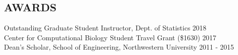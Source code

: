\documentclass[margin, 10pt]{res} %
\begin{document}
\begin{resume}
\section{AWARDS} 

Outstanding Graduate Student Instructor, Dept. of Statistics \hfill 2018\\
Center for Computational Biology Student Travel Grant (\$1630) \hfill 2017\\
Dean’s Scholar, School of Engineering, Northwestern University \hfill 2011 - 2015\\


\end{resume}
\end{document}
